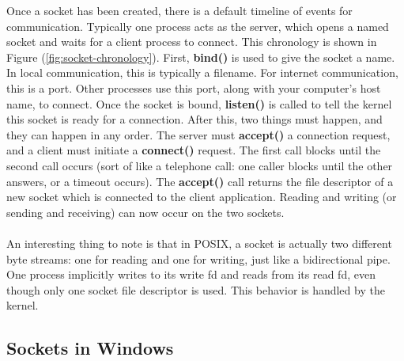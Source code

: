 \documentclass[11pt]{article}
\begin{document}
Once a socket has been created, there is a default timeline of events for communication. Typically one process acts as the server, which opens a named socket and waits for a client process to connect. This chronology is shown in Figure (\ref{fig:socket-chronology}). First, \textbf{bind()} is used to give the socket a name. In local communication, this is typically a filename. For internet communication, this is a port. Other processes use this port, along with your computer's host name, to connect. Once the socket is bound, \textbf{listen()} is called to tell the kernel this socket is ready for a connection. After this, two things must happen, and they can happen in any order. The server must \textbf{accept()} a connection request, and a client must initiate a \textbf{connect()} request. The first call blocks until the second call occurs (sort of like a telephone call: one caller blocks until the other answers, or a timeout occurs). The \textbf{accept()} call returns the file descriptor of a new socket which is connected to the client application. Reading and writing (or sending and receiving) can now occur on the two sockets.\\ \\
An interesting thing to note is that in POSIX, a socket is actually two different byte streams: one for reading and one for writing, just like a bidirectional pipe. One process implicitly writes to its write fd and reads from its read fd, even though only one socket file descriptor is used. This behavior is handled by the kernel. \\

\subsection{Sockets in Windows}
\end{document}
